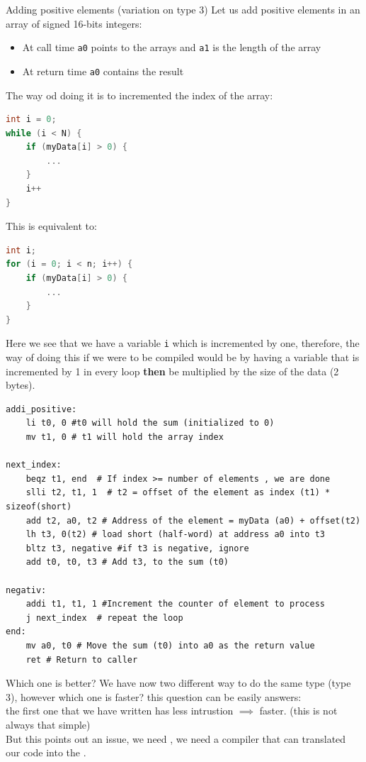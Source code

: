 \begin{parag}{Adding positive elements (variation on type 3)}
	Let us add positive elements in an array of signed 16-bits integers:
	\begin{itemize}
	    \item At call time \textrightarrow \texttt{a0} points to the arrays and \texttt{a1} is the length of the array
	    \item At return time \textrightarrow \texttt{a0} contains the result
	\end{itemize}
	The way od doing it is to incremented the index of the array:\\
	\begin{lstlisting}[language=c]
int i = 0;
while (i < N) {
	if (myData[i] > 0) {
		...
	}
	i++
}
	\end{lstlisting}
	This is equivalent to:
	\begin{lstlisting}[language=c]
int i;
for (i = 0; i < n; i++) {
	if (myData[i] > 0) {
		...
	}
}
	\end{lstlisting}
	
	Here we see that we have a variable \texttt{i}  which is incremented by one, therefore, the way of doing this if we were to be compiled would be by having a variable that is incremented by 1 in every loop \textbf{then} be multiplied by the size of the data (2 bytes).
	\begin{lstlisting}[language={[RISC-V]Assembler}]
addi_positive:
	li t0, 0 #t0 will hold the sum (initialized to 0)
	mv t1, 0 # t1 will hold the array index

next_index:
	beqz t1, end  # If index >= number of elements , we are done
	slli t2, t1, 1  # t2 = offset of the element as index (t1) * sizeof(short)
	add t2, a0, t2 # Address of the element = myData (a0) + offset(t2)
	lh t3, 0(t2) # load short (half-word) at address a0 into t3
	bltz t3, negative #if t3 is negative, ignore
	add t0, t0, t3 # Add t3, to the sum (t0)

negativ:
	addi t1, t1, 1 #Increment the counter of element to process
	j next_index  # repeat the loop
end:
	mv a0, t0 # Move the sum (t0) into a0 as the return value
	ret # Return to caller
	\end{lstlisting}
	
	\begin{subparag}{Which one is better?}
	    We have now two different way to do the same type (type 3), however which one is faster? this question can be easily answers: \\
		the first one that we have written has less intrustion $\implies$ faster. (this is not always that simple)\\
		But this points out an issue, we need , we need a compiler that can translated our code into the .
	\end{subparag}
\end{parag}


